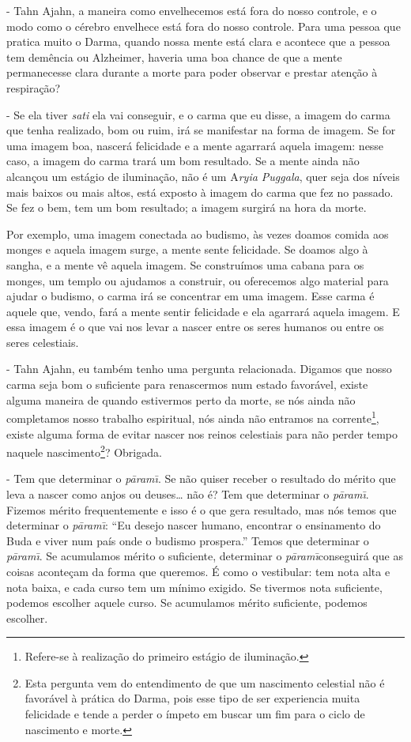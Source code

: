 - Tahn Ajahn, a maneira como envelhecemos está fora do nosso
controle, e o modo como o cérebro envelhece está fora do nosso
controle. Para uma pessoa que pratica muito o Darma, quando nossa mente
está clara e acontece que a pessoa tem demência ou Alzheimer, haveria
uma boa chance de que a mente permanecesse clara durante a morte para
poder observar e prestar atenção à respiração?

- Se ela tiver \textit{sati }ela vai conseguir, e o carma que eu
disse, a imagem do carma que tenha realizado, bom ou ruim, irá se
manifestar na forma de imagem. Se for uma imagem boa, nascerá
felicidade e a mente agarrará aquela imagem: nesse caso, a imagem do
carma trará um bom resultado. Se a mente ainda não alcançou um estágio
de iluminação, não é um A\textit{ryia Puggala}, quer seja dos níveis
mais baixos ou mais altos, está exposto à imagem do carma que fez no
passado. Se fez o bem, tem um bom resultado; a imagem surgirá na hora
da morte.

Por exemplo, uma imagem conectada ao budismo, às vezes doamos comida
aos monges e aquela imagem surge, a mente sente felicidade. Se doamos
algo à sangha, e a mente vê aquela imagem. Se construímos uma cabana
para os monges, um templo ou ajudamos a construir, ou oferecemos algo
material para ajudar o budismo, o carma irá se concentrar em uma
imagem. Esse carma é aquele que, vendo, fará a mente sentir felicidade
e ela agarrará aquela imagem. E essa imagem é o que vai nos levar a
nascer entre os seres humanos ou entre os seres celestiais.

- Tahn Ajahn, eu também tenho uma pergunta relacionada. Digamos
que nosso carma seja bom o suficiente para renascermos num estado
favorável, existe alguma maneira de quando estivermos perto da morte,
se nós ainda não completamos nosso trabalho espiritual, nós ainda não
entramos na corrente\footnote{Refere-se à realização do primeiro
estágio de iluminação.}, existe alguma forma de evitar nascer nos
reinos celestiais para não perder tempo naquele
nascimento\footnote{Esta pergunta vem do entendimento de que um
nascimento celestial não é favorável à prática do Darma, pois esse tipo
de ser experiencia muita felicidade e tende a perder o ímpeto em buscar
um fim para o ciclo de nascimento e morte.}? Obrigada.

- Tem que determinar o \textit{p\=aram\=\i}. Se não quiser receber
o resultado do mérito que leva a nascer como anjos\textit{ }ou deuses…
não é? Tem que determinar o \textit{p\=aram\=\i}. Fizemos mérito
frequentemente e isso é o que gera resultado, mas nós temos que
determinar o \textit{p\=aram\=\i}: “Eu desejo nascer humano, encontrar
o ensinamento do Buda e viver num país onde o budismo prospera.” Temos
que determinar o \textit{p\=aram\=\i}. Se acumulamos mérito o
suficiente, determinar o \textit{p\=aram\=\i }conseguirá que as coisas
aconteçam da forma que queremos. É como o vestibular: tem nota alta e
nota baixa, e cada curso tem um mínimo exigido. Se tivermos nota
suficiente, podemos escolher aquele curso. Se acumulamos mérito
suficiente, podemos escolher.

